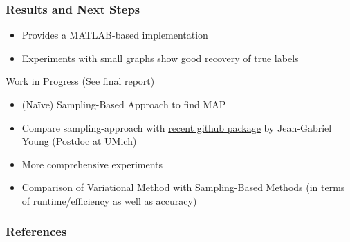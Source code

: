 \documentclass{beamer}
\newcommand{\1}{\mathbbm{1}}
\begin{document}
\begin{frame}
  \frametitle{Results and Next Steps}
  \begin{itemize}
  \item \parencite{aicher_learning_2015} Provides a MATLAB-based implementation
  \item Experiments with small graphs show good recovery of true labels
  \end{itemize}

  \begin{block}{Work in Progress (See final report)}
    \begin{itemize}
    \item (Na\"ive) Sampling-Based Approach to find MAP
    \item Compare sampling-approach with \href{{https://github.com/jg-you/sbm_canonical_mcmc/}}{recent github package} by Jean-Gabriel Young (Postdoc at UMich)
    \item More comprehensive experiments
    \item Comparison of Variational Method with Sampling-Based Methods (in terms of runtime/efficiency as well as accuracy)
    \end{itemize}
  \end{block}

\end{frame}


\begin{frame}[allowframebreaks]
  \frametitle{References}
  \printbibliography{}
  
\end{frame}
\end{document}
